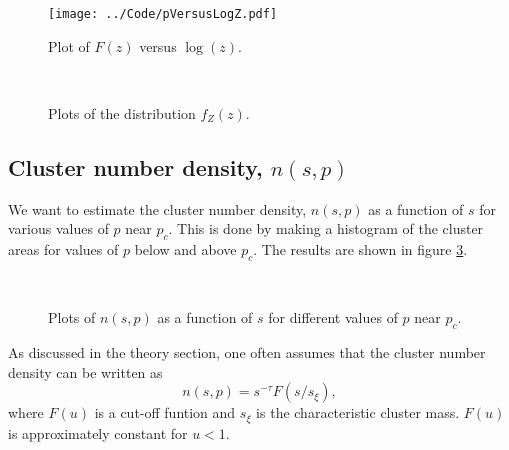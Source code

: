 \documentclass[12pt]{article}
\newcommand{\bdi}{\begin{displaymath}}
\newcommand{\edi}{\end{displaymath}}
\begin{document}
\begin{figure}[!ht]
    \begin{center}
	\texttt{[image: ../Code/pVersusLogZ.pdf]}
	\caption{Plot of $F(z)$ versus $\log(z)$.}
	\label{fig:F}
    \end{center}
\end{figure}

\begin{figure}[!ht]
    \begin{center}
        \hspace{5mm}
        \\ 
    \end{center}
    \caption{Plots of the distribution $f_Z(z)$.}
    \label{fig:fVersusZ}
\end{figure}




\subsection*{Cluster number density, $n(s,p)$}
We want to estimate the cluster number density, $n(s,p)$ as a function of $s$ for various values of $p$ near $p_c$. This is done by making a histogram of the cluster areas for values of $p$ below and
above $p_c$. The results are shown in figure \ref{fig:nsp}.

\begin{figure}[!ht]
    \begin{center}
        \hspace{5mm}
        \\ 
    \end{center}
    \caption{Plots of $n(s,p)$ as a function of $s$ for different values of $p$ near $p_c$.}
    \label{fig:nsp}
\end{figure}

As discussed in the theory section, one often assumes that the cluster number density can be written as
\bdi
n(s,p) = s^{-\tau}F(s/s_\xi),
\edi
where $F(u)$ is a cut-off funtion and $s_\xi$ is the characteristic cluster mass. $F(u)$ is approximately constant for $u<1$.
\end{document}
